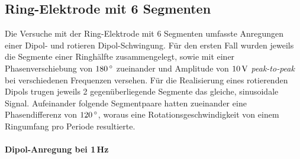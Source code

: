 \documentclass[numbers=noenddot,a4paper,notitlepage,twoside,BCOR15mm]{scrbook}
\newcommand{\degree}{^\circ}
\newcommand{\tilt}[1]{\textit{#1}}
\begin{document}
				\subsection*{Ring-Elektrode mit 6 Segmenten}


					Die Versuche mit der Ring-Elektrode mit 6 Segmenten umfasste Anregungen einer Dipol- und rotieren Dipol-Schwingung. Für den ersten Fall wurden jeweils die Segmente einer Ringhälfte zusammengelegt, sowie mit einer Phasenverschiebung von $\unit[180]{\degree}$ zueinander und Amplitude von $\unit[10]{V}$ \tilt{peak-to-peak} bei verschiedenen Frequenzen versehen. Für die Realisierung eines rotierenden Dipols trugen jeweils 2 gegenüberliegende Segmente das gleiche, sinusoidale Signal. Aufeinander folgende Segmentpaare hatten zueinander eine Phasendifferenz von $\unit[120]{\degree}$, woraus eine Rotationsgeschwindigkeit von einem Ringumfang pro Periode resultierte.


						\paragraph{Dipol-Anregung bei 1\,Hz}
\end{document}
